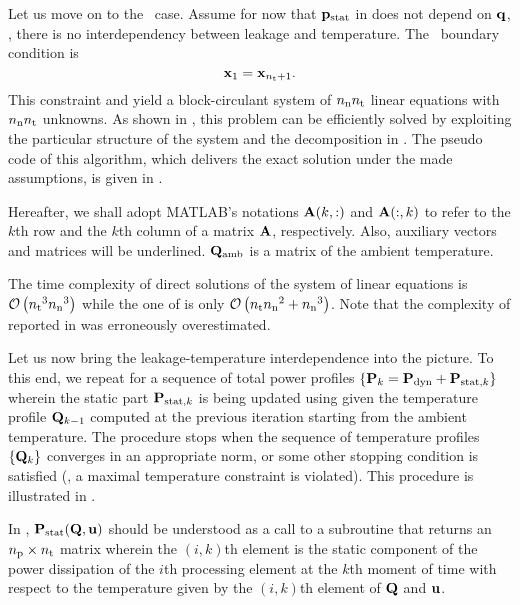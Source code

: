 Let us move on to the \dss\ case.
Assume for now that $\mathbf{p}_{\text{stat}}$ in  does not depend on $\mathbf{q}$, \ie, there is no interdependency between leakage and temperature.
The \dss\ boundary condition is
\[
  \mathbf{x}_1 = \mathbf{x}_{{n_\text{t}} + 1}.
\]
This constraint and  yield a block-circulant system of ${n_\text{n}} {n_\text{t}}$ linear equations with ${n_\text{n}} {n_\text{t}}$ unknowns.
As shown in \cite{ukhov2012}, this problem can be efficiently solved by exploiting the particular structure of the system and the decomposition in .
The pseudo code of this algorithm, which delivers the exact solution under the made assumptions, is given in .


Hereafter, we shall adopt MATLAB's notations $\mathbf{A}(k, :)$ and $\mathbf{A}(:, k)$ to refer to the $k$th row and the $k$th column of a matrix $\mathbf{A}$, respectively.
Also, auxiliary vectors and matrices will be underlined.
$\mathbf{Q}_{\text{amb}}$ is a matrix of the ambient temperature.
\begin{remark}
The time complexity of direct solutions of the system of linear equations is $\mathcal{O}\left( {n_\text{t}}^3 {n_\text{n}}^3 \right)$ while the one of  is only $\mathcal{O}\left( {n_\text{t}} {n_\text{n}}^2 + {n_\text{n}}^3 \right)$.
Note that the complexity of  reported in \cite{ukhov2012} was erroneously overestimated.
\end{remark}

Let us now bring the leakage-temperature interdependence into the picture.
To this end, we repeat  for a sequence of total power profiles $\{ \mathbf{P}_k = \mathbf{P}_{\text{dyn}} + \mathbf{P}_{\text{stat}, k} \}$ wherein the static part $\mathbf{P}_{\text{stat}, k}$ is being updated using  given the temperature profile $\mathbf{Q}_{k - 1}$ computed at the previous iteration starting from the ambient temperature.
The procedure stops when the sequence of temperature profiles $\{ \mathbf{Q}_k \}$ converges in an appropriate norm, or some other stopping condition is satisfied (\eg, a maximal temperature constraint is violated).
This procedure is illustrated in .


In , $\mathbf{P}_{\text{stat}}(\mathbf{Q}, \mathbf{u})$ should be understood as a call to a subroutine that returns an ${n_\text{p}} \times {n_\text{t}}$ matrix wherein the $(i, k)$th element is the static component of the power dissipation of the $i$th processing element at the $k$th moment of time with respect to the temperature given by the $(i, k)$th element of $\mathbf{Q}$ and $\mathbf{u}$.

